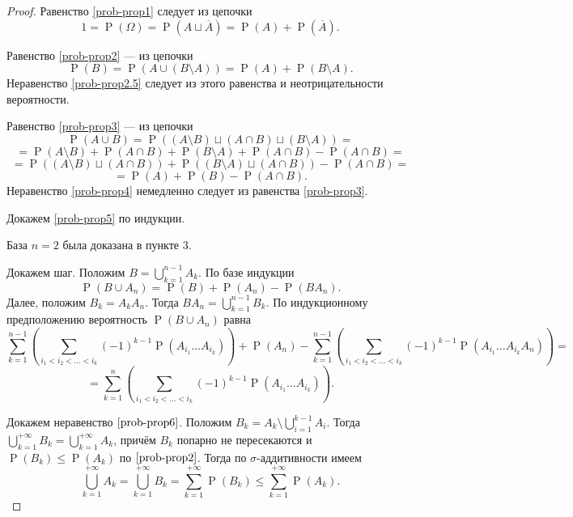 \documentclass[12pt]{article}
\numberwithin{theorem}{section}
\theoremstyle{definition}
\newcommand{\prob}{\operatorname{P}}
\begin{document}
	\begin{proof}
		Равенство \ref{prob-prop1} следует из цепочки 
		$$ 1 = \prob(\Omega) = \prob(A \sqcup \overline{A}) = \prob(A) + \prob(\overline{A}). $$
		
		Равенство \ref{prob-prop2} --- из цепочки 
		$$ \prob(B) = \prob(A \cup (B \setminus A)) = \prob(A) + \prob(B \setminus A). $$
		Неравенство \ref{prob-prop2.5} следует из этого равенства и неотрицательности вероятности.
		
		Равенство \ref{prob-prop3} --- из цепочки
		$$ \prob(A \cup B) = \prob((A \setminus B) \sqcup (A \cap B) \sqcup (B \setminus A)) = $$ 
		$$ = \prob(A \setminus B) + \prob(A \cap B) + \prob(B \setminus A) + \prob(A \cap B) - \prob(A \cap B) = $$
		$$ = \prob((A \setminus B) \sqcup (A \cap B)) + \prob((B \setminus A) \sqcup (A \cap B)) - \prob(A \cap B) = $$
		$$ = \prob(A) + \prob(B) - \prob (A \cap B). $$
		Неравенство \ref{prob-prop4} немедленно следует из равенства \ref{prob-prop3}.
		
		Докажем \ref{prob-prop5} по индукции.
		
		База $ n = 2 $ была доказана в пункте 3.
		
		Докажем шаг.
		Положим $ B = \bigcup\limits_{k = 1}^{n - 1} A_k $.
		По базе индукции $$ \prob(B \cup A_{n}) = \prob(B) + \prob(A_n) - \prob(B A_n). $$
		Далее, положим $ B_k = A_kA_n $. Тогда $ BA_n = \bigcup\limits_{k = 1}^{n - 1} B_k $.
		По индукционному предположению вероятность $ \prob(B \cup A_n) $ равна
		$$ \sum\limits_{k = 1}^{n - 1} 
		\left(\sum\limits_{i_1 < i_2 < \ldots < i_k} (-1)^{k - 1}\prob(A_{i_1} \ldots A_{i_k})\right)
		+ \prob(A_n)
		- \sum\limits_{k = 1}^{n - 1} 
		\left(\sum\limits_{i_1 < i_2 < \ldots < i_k} (-1)^{k - 1}\prob(A_{i_1} \ldots A_{i_k} A_{n})\right) = $$
		$$ = \sum\limits_{k = 1}^{n} 
		\left(\sum\limits_{i_1 < i_2 < \ldots < i_k} (-1)^{k - 1}\prob(A_{i_1} \ldots A_{i_k})\right). $$
		
		Докажем неравенство $ \ref{prob-prop6} $.
		Положим $ B_k = A_k \setminus \bigcup\limits_{i = 1}^{k - 1} A_i $.
		Тогда $ \bigcup\limits_{k = 1}^{+\infty} B_k = \bigcup\limits_{k = 1}^{+\infty} A_k $,
		причём  $ B_k $ попарно не пересекаются и $ \prob(B_k) \leqslant \prob(A_k) $ по $ \ref{prob-prop2} $.
		Тогда по $ \sigma $-аддитивности имеем 
		$$ \bigcup\limits_{k = 1}^{+\infty} A_k = \bigcup\limits_{k = 1}^{+\infty} B_k 
		= \sum\limits_{k = 1}^{+\infty} \prob(B_k) \leqslant \sum\limits_{k = 1}^{+\infty} \prob(A_k). $$
	\end{proof}
	
\end{document}
